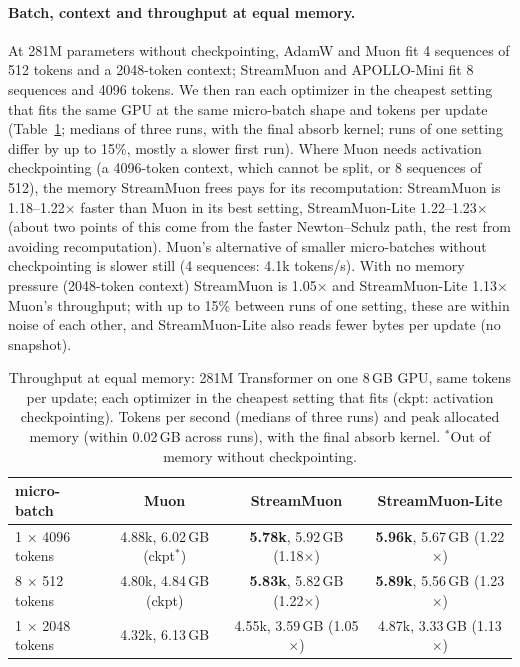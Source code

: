 \documentclass[10pt]{article}
\newcommand{\method}{StreamMuon}\newcommand{\lite}{StreamMuon-Lite}
\begin{document}
\paragraph{Batch, context and throughput at equal memory.} At 281M parameters without checkpointing, AdamW and Muon fit
4 sequences of 512 tokens and a 2048-token context; \method{} and APOLLO-Mini fit 8 sequences and 4096 tokens. We then
ran each optimizer in the cheapest setting that fits the same GPU at the same micro-batch shape and tokens per update
(Table~\ref{tab:iso}; medians of three runs, with the final absorb kernel; runs of one setting differ by up to 15\%,
mostly a slower first run). Where Muon needs activation checkpointing (a 4096-token
context, which cannot be split, or 8 sequences of 512), the memory \method{} frees pays for its recomputation:
\method{} is 1.18--1.22$\times$ faster than Muon in its best setting, \lite{} 1.22--1.23$\times$ (about two points of
this come from the faster Newton--Schulz path, the rest from avoiding recomputation). Muon's alternative of
smaller micro-batches without checkpointing is slower still (4 sequences: 4.1k tokens/s). With no memory pressure
(2048-token context) \method{} is 1.05$\times$ and \lite{} 1.13$\times$ Muon's throughput; with up to 15\% between runs of
one setting, these are within noise of each other, and \lite{} also reads fewer bytes per update (no snapshot).

\begin{table}[!t]
\centering\small
\caption{Throughput at equal memory: 281M Transformer on one 8\,GB GPU, same tokens per update; each optimizer in the
cheapest setting that fits (ckpt: activation checkpointing). Tokens per second (medians of three runs) and peak
allocated memory (within 0.02\,GB across runs), with the final absorb kernel. $^*$Out of memory without
checkpointing.}
\label{tab:iso}
\begin{tabular}{lccc}
\toprule
micro-batch & Muon & \method{} & \lite{} \\
\midrule
1 $\times$ 4096 tokens & 4.88k, 6.02\,GB (ckpt$^*$) & \textbf{5.78k}, 5.92\,GB (1.18$\times$) & \textbf{5.96k}, 5.67\,GB (1.22$\times$) \\
8 $\times$ 512 tokens & 4.80k, 4.84\,GB (ckpt) & \textbf{5.83k}, 5.82\,GB (1.22$\times$) & \textbf{5.89k}, 5.56\,GB (1.23$\times$) \\
1 $\times$ 2048 tokens & 4.32k, 6.13\,GB & 4.55k, 3.59\,GB (1.05$\times$) & 4.87k, 3.33\,GB (1.13$\times$) \\
\bottomrule
\end{tabular}
\end{table}
\end{document}
